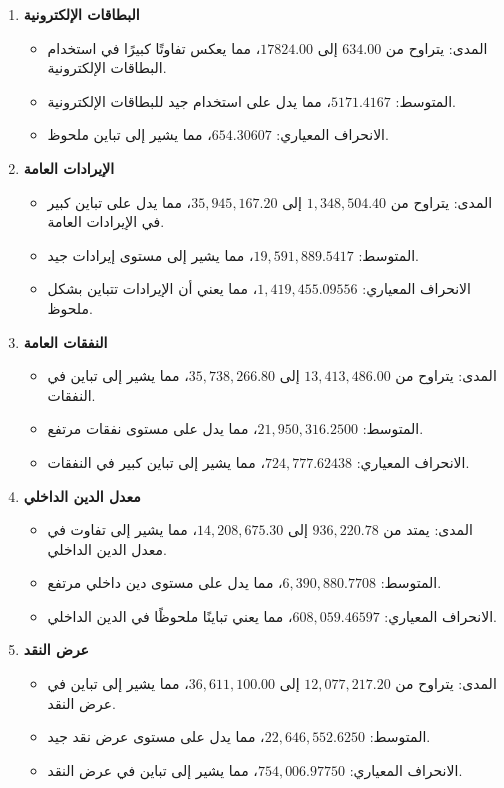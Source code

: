 \documentclass[10pt,a4paper]{report}
\begin{document}
\begin{doublespacing}
\begin{enumerate}
	\item \textbf{البطاقات الإلكترونية}
	\begin{itemize}
		\item المدى: يتراوح من $634.00$ إلى $17824.00$، مما يعكس تفاوتًا كبيرًا في استخدام البطاقات الإلكترونية.
		\item المتوسط: $5171.4167$، مما يدل على استخدام جيد للبطاقات الإلكترونية.
		\item الانحراف المعياري: $654.30607$، مما يشير إلى تباين ملحوظ.
	\end{itemize}
	
	\item \textbf{الإيرادات العامة}
	\begin{itemize}
		\item المدى: يتراوح من $1,348,504.40$ إلى $35,945,167.20$، مما يدل على تباين كبير في الإيرادات العامة.
		\item المتوسط: $19,591,889.5417$، مما يشير إلى مستوى إيرادات جيد.
		\item الانحراف المعياري: $1,419,455.09556$، مما يعني أن الإيرادات تتباين بشكل ملحوظ.
	\end{itemize}
	
	\item \textbf{النفقات العامة}
	\begin{itemize}
		\item المدى: يتراوح من $13,413,486.00$ إلى $35,738,266.80$، مما يشير إلى تباين في النفقات.
		\item المتوسط: $21,950,316.2500$، مما يدل على مستوى نفقات مرتفع.
		\item الانحراف المعياري: $724,777.62438$، مما يشير إلى تباين كبير في النفقات.
	\end{itemize}
	
	\item \textbf{معدل الدين الداخلي}
	\begin{itemize}
		\item المدى: يمتد من $936,220.78$ إلى $14,208,675.30$، مما يشير إلى تفاوت في معدل الدين الداخلي.
		\item المتوسط: $6,390,880.7708$، مما يدل على مستوى دين داخلي مرتفع.
		\item الانحراف المعياري: $608,059.46597$، مما يعني تباينًا ملحوظًا في الدين الداخلي.
	\end{itemize}
	
	\item \textbf{عرض النقد}
	\begin{itemize}
		\item المدى: يتراوح من $12,077,217.20$ إلى $36,611,100.00$، مما يشير إلى تباين في عرض النقد.
		\item المتوسط: $22,646,552.6250$، مما يدل على مستوى عرض نقد جيد.
		\item الانحراف المعياري: $754,006.97750$، مما يشير إلى تباين في عرض النقد.
	\end{itemize}
	

\end{enumerate}
\end{doublespacing}
\end{document}
